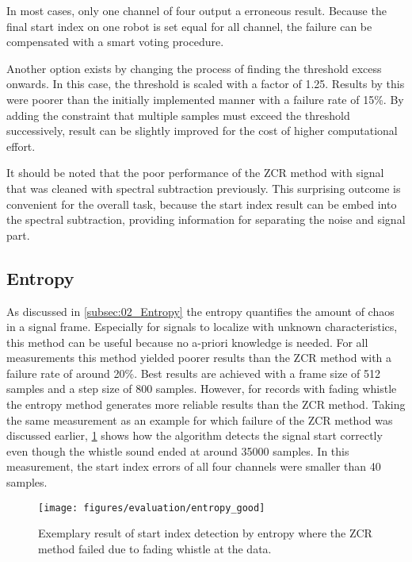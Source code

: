 In most cases, only one channel of four output a erroneous result.
Because the final start index on one robot is set equal for all channel,
the failure can be compensated with a smart voting procedure.

Another option exists by changing the process of finding the
threshold excess onwards.
In this case, the threshold is scaled with a factor of 1.25.
Results by this were poorer than the initially implemented manner
with a failure rate of 15\si{\percent}.
By adding the constraint that multiple samples must exceed the
threshold successively, result can be slightly improved for the cost of higher
computational effort.

It should be noted that the poor performance of the \ac{ZCR} method with signal that
was cleaned with spectral subtraction previously. This surprising outcome is
convenient for the overall task, because the start index result can be embed
into the spectral subtraction, providing information for separating the noise
and signal part.

\subsection{Entropy}
\label{subsec:04_entropy}

As discussed in \cref{subsec:02_Entropy} the entropy quantifies the amount
of chaos in a signal frame.
Especially for signals to localize with unknown characteristics,
this method can be useful because no a-priori knowledge is needed.
For all measurements this method yielded poorer results than the \ac{ZCR} method
with a failure rate of around 20\si{\percent}.
Best results are achieved with a frame size of 512 samples and a step size of 800
samples.
However, for records with fading whistle the entropy method
generates more reliable results than the \ac{ZCR} method.
Taking the same measurement as an example for which failure of the \ac{ZCR} method
was discussed earlier, \cref{fig:04_entropyGood} shows how the algorithm
detects the signal start correctly even though the whistle sound ended at
around 35000 samples. In this measurement, the start index errors of all four
channels were smaller than 40 samples.
\begin{figure}[ht]
	\centering
	\texttt{[image: figures/evaluation/entropy\_good]}
	\caption{Exemplary result of start index detection by entropy where
			the \ac{ZCR} method failed due to fading whistle
			at the data.}
	\label{fig:04_entropyGood}
\end{figure}

